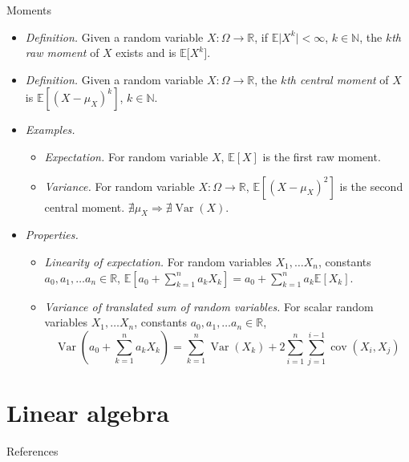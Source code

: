 \documentclass{beamer}
\numberwithin{equation}{section}
\begin{document}
\begin{frame}{Moments}
    \begin{itemize}
        \item
        \textit{Definition.} Given a random variable $ X : \Omega \rightarrow
        \mathbb{R} $, if $ \mathbb{E}\big|X^k\big| < \infty $,
        $ k \in \mathbb{N} $, the $ k $\textit{th raw moment} of $ X $ exists
        \cite{wasserman_stats} and is $ \mathbb{E}\big[X^k\big] $.

        \item
        \textit{Definition.} Given a random variable $ X : \Omega \rightarrow
        \mathbb{R} $, the $ k $\textit{th central moment} of $ X $ is
        $ \mathbb{E}\left[(X - \mu_X)^k\right] $, $ k \in \mathbb{N} $.

        \item
        \textit{Examples.}
        \begin{itemize}
            \item
            \textit{Expectation.} For random variable $ X $, $ \mathbb{E}[X] $
            is the first raw moment.

            \item
            \textit{Variance.} For random variable $ X : \Omega \rightarrow
            \mathbb{R} $, $ \mathbb{E}\left[(X - \mu_X)^2\right] $ is the
            second central moment. $ \nexists \mu_X \Rightarrow \nexists
            \operatorname{Var}(X) $.
        \end{itemize}

         \item
         \textit{Properties.}
         \begin{itemize}
             \item
             \textit{Linearity of expectation.} For random variables
             $ X_1, \ldots X_n $, constants
             $ a_0, a_1, \ldots a_n \in \mathbb{R} $,
             $ \mathbb{E}\left[a_0 + \sum_{k = 1}^na_kX_k\right] =
             a_0 + \sum_{k = 1}^na_k\mathbb{E}[X_k] $.

            \item
            \textit{Variance of translated sum of random variables.} For scalar random
            variables $ X_1, \ldots X_n $, constants
            $ a_0, a_1, \ldots a_n \in \mathbb{R} $,
            \begin{equation*}
                \operatorname{Var}\left(a_0 + \sum_{k = 1}^na_kX_k\right) =
                \sum_{k = 1}^n\operatorname{Var}(X_k) +
                2\sum_{i = 1}^n\sum_{j = 1}^{i - 1}\operatorname{cov}(X_i, X_j)
            \end{equation*}
         \end{itemize}
    \end{itemize}
\end{frame}

\section{Linear algebra}

\begin{frame}{References}
    
    
\end{frame}
\end{document}
